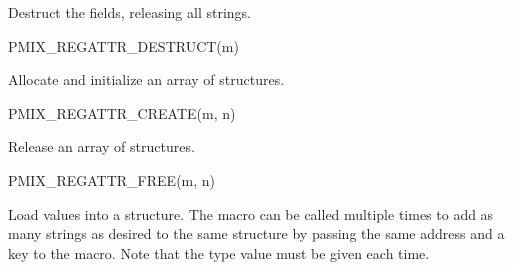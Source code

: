 
Destruct the  fields, releasing all strings.

\cspecificstart
\begin{codepar}
PMIX_REGATTR_DESTRUCT(m)
\end{codepar}
\cspecificend

\begin{arglist}
\end{arglist}


Allocate and initialize an array of  structures.

\cspecificstart
\begin{codepar}
PMIX_REGATTR_CREATE(m, n)
\end{codepar}
\cspecificend

\begin{arglist}
\end{arglist}


Release an array of  structures.

\cspecificstart
\begin{codepar}
PMIX_REGATTR_FREE(m, n)
\end{codepar}
\cspecificend

\begin{arglist}
\end{arglist}


Load values into a  structure. The macro can be called multiple times to add as many strings as desired to the same structure by passing the same address and a  key to the macro. Note that the  type value must be given each time.

